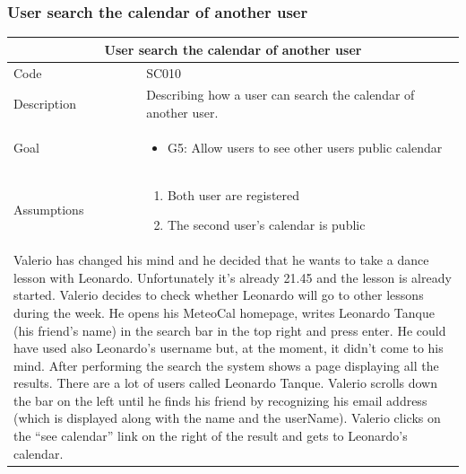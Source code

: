 \documentclass[10pt,a4paper,titlepage]{article}
\begin{document}
\subsubsection{User search the calendar of another user }
\begin{tabular}{| p{3cm} | p{10cm} |}
\hline \multicolumn{2}{|c|}{\textbf{User search the calendar of another user }} \\ 
\hline Code & SC010 \\ 
\hline Description & Describing how a user can search the calendar of another user.\\
\hline Goal & \begin{itemize}\item G5: Allow users to see other users public calendar\end{itemize}\\
\hline Assumptions & \begin{enumerate}
\item Both user are registered
\item The second user's calendar is public
\end{enumerate} \\
\hline \multicolumn{2}{|p{13cm}|}{Valerio has changed his mind and he decided that he wants to take a dance lesson with Leonardo. Unfortunately it’s already 21.45 and the lesson is already started. Valerio decides to check whether Leonardo will go to other lessons during the week. He opens his MeteoCal homepage, writes Leonardo Tanque (his friend’s name) in the search bar in the top right and press enter. He could have used also Leonardo’s username but, at the moment, it didn’t come to his mind. After performing the search the system shows a page displaying all the results. There are a lot of users called Leonardo Tanque. Valerio scrolls down the bar on the left until he finds his friend by recognizing his email address (which is displayed along with the name and the userName). Valerio clicks on the “see calendar” link on the right of the result and gets to Leonardo’s calendar.}\\
\hline
\end{tabular}
\end{document}
